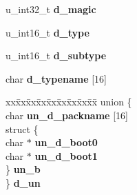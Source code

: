 \begin{DoxyCompactItemize}
\item 
\mbox{\label{structolddisklabel_a2937d30c52880240dc8b8d91bc9813d6}} 
u\+\_\+int32\+\_\+t {\bfseries d\+\_\+magic}
\item 
\mbox{\label{structolddisklabel_a31e229e4cd5b0f2f615f1ef685f0edf9}} 
u\+\_\+int16\+\_\+t {\bfseries d\+\_\+type}
\item 
\mbox{\label{structolddisklabel_ad1df0755528d7b358a29674e6ab27632}} 
u\+\_\+int16\+\_\+t {\bfseries d\+\_\+subtype}
\item 
\mbox{\label{structolddisklabel_a2b907a5773e2ddc3cb8b6ae3278139de}} 
char {\bfseries d\+\_\+typename} \mbox{[}16\mbox{]}
\item 
\mbox{\label{structolddisklabel_a744f0cc3116a06418eaf1409db6c8b8d}} 
\begin{tabbing}
xx\=xx\=xx\=xx\=xx\=xx\=xx\=xx\=xx\=\kill
union \{\\
\>char {\bfseries un\_d\_packname} \mbox{[}16\mbox{]}\\
\>struct \{\\
\>\>char $\ast$ {\bfseries un\_d\_boot0}\\
\>\>char $\ast$ {\bfseries un\_d\_boot1}\\
\>\} {\bfseries un\_b}\\
\} {\bfseries d\_un}\\


\end{tabbing}
\end{DoxyCompactItemize}
